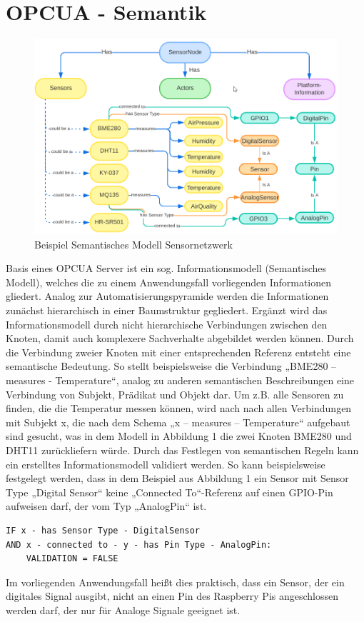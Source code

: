 \section{OPCUA - Semantik}\label{ch:opcua}

\begin{figure}[thpb]
      \centering
      \includegraphics[scale=0.4]{abbildungen/opcua_semantic_schema.png}
      \caption{Beispiel Semantisches Modell Sensornetzwerk}
\end{figure}
Basis eines OPCUA Server ist ein sog. Informationsmodell (Semantisches Modell), welches die zu einem Anwendungsfall vorliegenden Informationen gliedert. Analog zur Automatisierungspyramide werden die Informationen zunächst hierarchisch in einer Baumstruktur gegliedert. Ergänzt wird das Informationsmodell durch nicht hierarchische Verbindungen zwischen den Knoten, damit auch komplexere Sachverhalte abgebildet werden können.
\newline
\newline
Durch die Verbindung zweier Knoten mit einer entsprechenden Referenz entsteht eine semantische Bedeutung. So stellt beispielsweise die Verbindung „BME280 – measures - Temperature“, analog zu anderen semantischen Beschreibungen eine Verbindung von Subjekt, Prädikat und Objekt dar.
Um z.B. alle Sensoren zu finden, die die Temperatur messen können, wird nach nach allen Verbindungen mit Subjekt x, die nach dem Schema „x – measures – Temperature“ aufgebaut sind gesucht, was in dem Modell in Abbildung 1 die zwei Knoten BME280 und DHT11 zurückliefern würde.
\newline
\newline
Durch das Festlegen von semantischen Regeln kann ein erstelltes Informationsmodell validiert werden. So kann beispielsweise festgelegt werden, dass in dem Beispiel aus Abbildung 1 ein Sensor mit Sensor Type „Digital Sensor“ keine „Connected To“-Referenz auf einen GPIO-Pin aufweisen darf, der vom Typ „AnalogPin“ ist.
\newline
\begin{lstlisting}[caption={Semantische Validierung Digitaler Sensor},captionpos=b,showstringspaces=false, basicstyle=\footnotesize]
IF x - has Sensor Type - DigitalSensor
AND x - connected to - y - has Pin Type - AnalogPin: 
    VALIDATION = FALSE
\end{lstlisting}

Im vorliegenden Anwendungsfall heißt dies praktisch, dass ein Sensor, der ein digitales Signal ausgibt, nicht an einen Pin des Raspberry Pis angeschlossen werden darf, der nur für Analoge Signale geeignet ist. 
